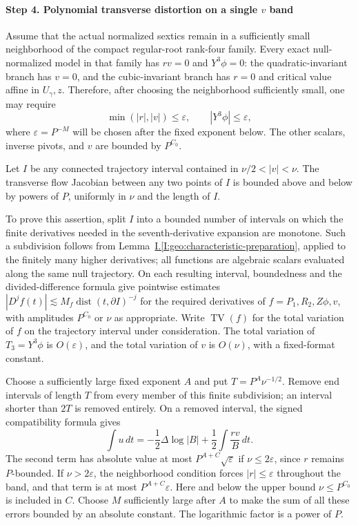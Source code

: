 \documentclass[11pt]{amsart}
\theoremstyle{definition}
\theoremstyle{remark}
\numberwithin{equation}{section}
\newcommand{\partIref}[1]{\hyperref[I:#1]{I.\ref*{I:#1}}}
\begin{document}
\paragraph{Step 4. Polynomial transverse distortion on a single \texorpdfstring{$v$}{v} band}\label{low:6:s36cg:polynomial-distortion}

Assume that the actual normalized sextics remain in a sufficiently small neighborhood of the compact regular-root rank-four family. Every exact null-normalized model in that family has $rv=0$ and $Y^3\phi=0$: the quadratic-invariant branch has $v=0$, and the cubic-invariant branch has $r=0$ and critical value affine in $U_\gamma,z$. Therefore, after choosing the neighborhood sufficiently small, one may require
\[
\min(|r|,|v|)\le\varepsilon,\qquad |Y^3\phi|\le\varepsilon,
\]
where $\varepsilon=P^{-M}$ will be chosen after the fixed exponent below. The other scalars, inverse pivots, and $v$ are bounded by $P^{C_0}$.

Let $I$ be any connected trajectory interval contained in $\nu/2<|v|<\nu$. The transverse flow Jacobian between any two points of $I$ is bounded above and below by powers of $P$, uniformly in $\nu$ and the length of $I$.

To prove this assertion, split $I$ into a bounded number of intervals on which the finite derivatives needed in the seventh-derivative expansion are monotone. Such a subdivision follows from Lemma~\partIref{geo:characteristic-preparation}, applied to the finitely many higher derivatives; all functions are algebraic scalars evaluated along the same null trajectory. On each resulting interval, boundedness and the divided-difference formula \cite[equation (44)]{deBoor} give pointwise estimates $|D^jf(t)|\lesssim M_f\operatorname{dist}(t,\partial I)^{-j}$ for the required derivatives of $f=P_1,R_2,Z\phi,v$, with amplitudes $P^{C_0}$ or $\nu$ as appropriate. Write $\operatorname{TV}(f)$ for the total variation of $f$ on the trajectory interval under consideration. The total variation of $T_3=Y^3\phi$ is $O(\varepsilon)$, and the total variation of $v$ is $O(\nu)$, with a fixed-format constant.

Choose a sufficiently large fixed exponent $A$ and put $T=P^A\nu^{-1/2}$. Remove end intervals of length $T$ from every member of this finite subdivision; an interval shorter than $2T$ is removed entirely. On a removed interval, the signed compatibility formula gives
\[
\int u\,dt=-\frac12\Delta\log|B|+\frac12\int\frac{rv}{B}\,dt.
\]
The second term has absolute value at most $P^{A+C}\sqrt{\varepsilon}$ if $\nu\le2\varepsilon$, since $r$ remains $P$-bounded. If $\nu>2\varepsilon$, the neighborhood condition forces $|r|\le\varepsilon$ throughout the band, and that term is at most $P^{A+C}\varepsilon$. Here and below the upper bound $\nu\le P^{C_0}$ is included in $C$. Choose $M$ sufficiently large after $A$ to make the sum of all these errors bounded by an absolute constant. The logarithmic factor is a power of $P$.
\end{document}

